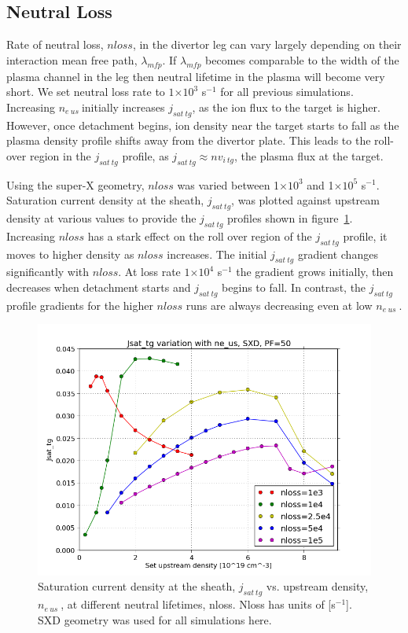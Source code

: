 \documentclass[12pt]{article}  %
\providecommand{\e}[1]{\ensuremath{\times 10^{#1}}} %
\providecommand{\pow}[1]{{$^{#1}$}} %
\providecommand{\neus}{$n_{e~us}~$} %
\begin{document}
\subsection{Neutral Loss}\label{ssecNloss}
Rate of neutral loss, $nloss$, in the divertor leg can vary largely depending on their interaction mean free path, $\lambda_{mfp}$. If $\lambda_{mfp}$ becomes comparable to the width of the plasma channel in the leg then neutral lifetime in the plasma will become very short. We set neutral loss rate to $1\e{3}$ s\pow{-1} for all previous simulations. Increasing \neus initially increases $j_{sat~tg}$, as the ion flux to the target is higher. However, once detachment begins, ion density near the target starts to fall as the plasma density profile shifts away from the divertor plate. This leads to the roll-over region in the $j_{sat~tg}$ profile, as $j_{sat~tg} \approx nv_{i~tg}$, the plasma flux at the target.

Using the super-X geometry, $nloss$ was varied between 1\e{3} and 1\e{5} s\pow{-1}. Saturation current density at the sheath, $j_{sat~tg}$, was plotted against upstream density at various values to provide the $j_{sat~tg}$ profiles shown in figure~\ref{fignloss1e345,52.5e425_2}. Increasing $nloss$ has a stark effect on the roll over region of the $j_{sat~tg}$ profile, it moves to higher density as $nloss$ increases. The initial $j_{sat~tg}$ gradient changes significantly with $nloss$. At loss rate $1\e{4}$ s\pow{-1} the gradient grows initially, then decreases when detachment starts and $j_{sat~tg}$ begins to fall. In contrast, the $j_{sat~tg}$ profile gradients for the higher $nloss$ runs are always decreasing even at low \neus. 

\begin{figure}
\includegraphics[scale=0.5]{Figures/sol1d/nloss1e345,525e425_2.png}
\centering
\caption{Saturation current density at the sheath, $j_{sat~tg}$ vs. upstream density, \neus, at different neutral lifetimes, nloss. Nloss has units of [s\pow{-1}]. SXD geometry was used for all simulations here.}\label{fignloss1e345,52.5e425_2}
\end{figure}
\end{document}
